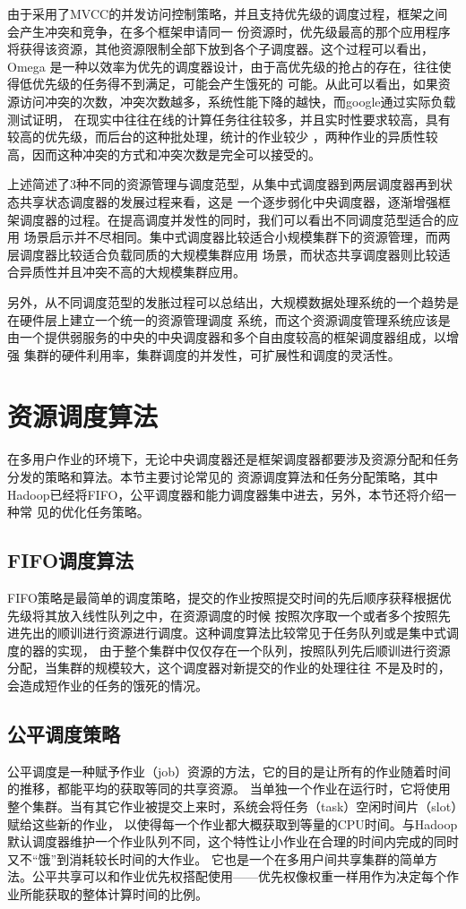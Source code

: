 由于采用了MVCC的并发访问控制策略，并且支持优先级的调度过程，框架之间会产生冲突和竞争，在多个框架申请同一
份资源时，优先级最高的那个应用程序将获得该资源，其他资源限制全部下放到各个子调度器。这个过程可以看出，Omega
是一种以效率为优先的调度器设计，由于高优先级的抢占的存在，往往使得低优先级的任务得不到满足，可能会产生饿死的
可能。从此可以看出，如果资源访问冲突的次数，冲突次数越多，系统性能下降的越快，而google通过实际负载测试证明，
在现实中往往在线的计算任务往往较多，并且实时性要求较高，具有较高的优先级，而后台的这种批处理，统计的作业较少
，两种作业的异质性较高，因而这种冲突的方式和冲突次数是完全可以接受的。

上述简述了3种不同的资源管理与调度范型，从集中式调度器到两层调度器再到状态共享状态调度器的发展过程来看，这是
一个逐步弱化中央调度器，逐渐增强框架调度器的过程。在提高调度并发性的同时，我们可以看出不同调度范型适合的应用
场景启示并不尽相同。集中式调度器比较适合小规模集群下的资源管理，而两层调度器比较适合负载同质的大规模集群应用
场景，而状态共享调度器则比较适合异质性并且冲突不高的大规模集群应用。

另外，从不同调度范型的发胀过程可以总结出，大规模数据处理系统的一个趋势是在硬件层上建立一个统一的资源管理调度
系统，而这个资源调度管理系统应该是由一个提供弱服务的中央的中央调度器和多个自由度较高的框架调度器组成，以增强
集群的硬件利用率，集群调度的并发性，可扩展性和调度的灵活性。

\section{资源调度算法}
 在多用户作业的环境下，无论中央调度器还是框架调度器都要涉及资源分配和任务分发的策略和算法。本节主要讨论常见的
 资源调度算法和任务分配策略，其中Hadoop已经将FIFO，公平调度器和能力调度器集中进去，另外，本节还将介绍一种常
 见的优化任务策略。
\subsection{FIFO调度算法}
FIFO策略是最简单的调度策略，提交的作业按照提交时间的先后顺序获释根据优先级将其放入线性队列之中，在资源调度的时候
按照次序取一个或者多个按照先进先出的顺训进行资源进行调度。这种调度算法比较常见于任务队列或是集中式调度的器的实现，
由于整个集群中仅仅存在一个队列，按照队列先后顺训进行资源分配，当集群的规模较大，这个调度器对新提交的作业的处理往往
不是及时的，会造成短作业的任务的饿死的情况。
\subsection{公平调度策略}
公平调度是一种赋予作业（job）资源的方法，它的目的是让所有的作业随着时间的推移，都能平均的获取等同的共享资源。
当单独一个作业在运行时，它将使用整个集群。当有其它作业被提交上来时，系统会将任务（task）空闲时间片（slot）赋给这些新的作业，
以使得每一个作业都大概获取到等量的CPU时间。与Hadoop默认调度器维护一个作业队列不同，这个特性让小作业在合理的时间内完成的同时又不“饿”到消耗较长时间的大作业。
它也是一个在多用户间共享集群的简单方法。公平共享可以和作业优先权搭配使用——优先权像权重一样用作为决定每个作业所能获取的整体计算时间的比例。

